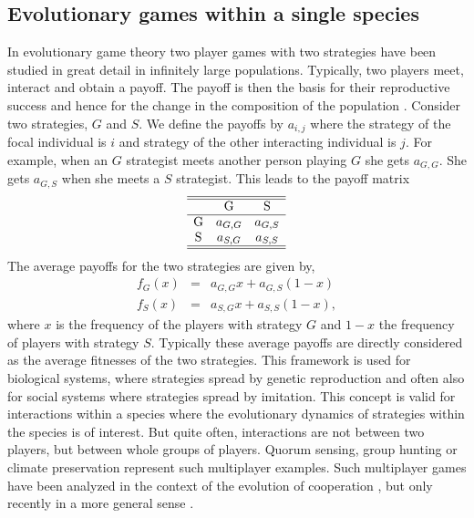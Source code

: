 \documentclass[aps,pre,amsfonts,floatfix, onecolumn,showkeys]{revtex4-1}
\begin{document}
\subsection{Evolutionary games within a single species}
\label{withinsp}
In evolutionary game theory two player games with two strategies have been studied in great detail in infinitely large populations.
Typically, two players meet, interact and obtain a payoff. 
The payoff is then the basis for their reproductive success and hence for the change in the composition of the population \cite{maynard-smith:book:1982}.
Consider two strategies, $G$ and $S$.
We define the payoffs by $a_{i,j}$ where the strategy of the focal individual is $i$ and strategy of the other interacting individual is $j$.
For example, when an $G$ strategist meets another person playing $G$ she gets $a_{G,G}$.
She gets $a_{G,S}$ when she meets a $S$ strategist.
This leads to the payoff matrix
%
\begin{equation}\label{eq:twobytwo}
\begin{array}{ccc}
\hline\hline
 &$G$	&	$S$\\
\hline
$G$ 	& a_{G,G} &	a_{G,S} 
 \\
 $S$ 	&  a_{S,G} &a_{S,S} \nonumber \\
 \hline\hline
\end{array}
\end{equation}
%
The average payoffs for the two strategies are given by, %
\begin{eqnarray}
f_{G} (x) &=& a_{G,G} x + a_{G,S} (1-x) \nonumber \\
f_{S} (x) &=& a_{S,G} x + a_{S,S} (1-x), 
\end{eqnarray}
%
where $x$ is the frequency of the players with strategy $G$ and $1-x$ the frequency of players with strategy $S$.
Typically these average payoffs are directly considered as the average fitnesses of the two strategies.
This framework is used for biological systems, where strategies spread by genetic reproduction and often also for social systems where strategies spread by imitation.
This concept is valid for interactions within a species where the evolutionary dynamics of strategies within the species is of interest.
But quite often, interactions are not between two players, but between whole groups of players. 
Quorum sensing,  group hunting or climate preservation represent such multiplayer examples.
Such multiplayer games have been analyzed in the context of the evolution of cooperation \cite{hardin:Science:1968,hauert:PRSB:1997,kollock:ARS:1998,rockenbach:Nature:2006,milinski:PNAS:2006,milinski:PNAS:2008}, but only recently in a  more general sense \cite{pacheco:PRSB:2009,kurokawa:PRSB:2009,souza:JTB:2009,gokhale:PNAS:2010}.
\end{document}
